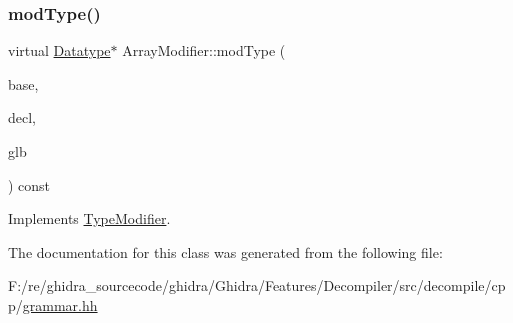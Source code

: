 \mbox{\label{class_array_modifier_a6e94c75eabef7320f99e2817ea62fc00}} 
\subsubsection{\texorpdfstring{modType()}{modType()}}
{\footnotesize\ttfamily virtual \mbox{\hyperlink{class_datatype}{Datatype}}$\ast$ Array\+Modifier\+::mod\+Type (\begin{DoxyParamCaption}\item[{\mbox{\hyperlink{class_datatype}{Datatype}} $\ast$}]{base,  }\item[{const \mbox{\hyperlink{class_type_declarator}{Type\+Declarator}} $\ast$}]{decl,  }\item[{\mbox{\hyperlink{class_architecture}{Architecture}} $\ast$}]{glb }\end{DoxyParamCaption}) const\hspace{0.3cm}{\ttfamily [virtual]}}



Implements \mbox{\hyperlink{class_type_modifier_aa476545f31ae45f4bd39c8afb7403406}{Type\+Modifier}}.



The documentation for this class was generated from the following file\+:\begin{DoxyCompactItemize}
\item 
F\+:/re/ghidra\+\_\+sourcecode/ghidra/\+Ghidra/\+Features/\+Decompiler/src/decompile/cpp/\mbox{\hyperlink{grammar_8hh}{grammar.\+hh}}\end{DoxyCompactItemize}
